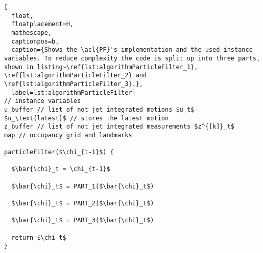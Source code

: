 \begin{lstlisting}[
  float,
  floatplacement=H,
  mathescape,
  captionpos=b,
  caption={Shows the \acl{PF}'s implementation and the used instance variables. To reduce complexity the code is split up into three parts, shown in listing~\ref{lst:algorithmParticleFilter_1}, \ref{lst:algorithmParticleFilter_2} and \ref{lst:algorithmParticleFilter_3}.},
  label=lst:algorithmParticleFilter]
// instance variables
u_buffer // list of not jet integrated motions $u_t$
$u_\text{latest}$ // stores the latest motion
z_buffer // list of not jet integrated measurements $z^{[k]}_t$
map // occupancy grid and landmarks

particleFilter($\chi_{t-1}$) {

  $\bar{\chi}_t = \chi_{t-1}$

  $\bar{\chi}_t$ = PART_1($\bar{\chi}_t$)

  $\bar{\chi}_t$ = PART_2($\bar{\chi}_t$)

  $\bar{\chi}_t$ = PART_3($\bar{\chi}_t$)

  return $\chi_t$
}
\end{lstlisting}
